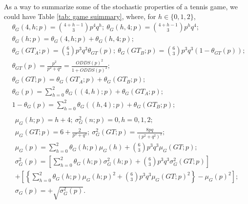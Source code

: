 \documentclass[11pt]{article}
\theoremstyle{plain}
\theoremstyle{definition}
\begin{document}
As a way to summarize some of the stochastic properties of a tennis game, we could have Table \ref{tab: game suimmary}, where, for $h \in \{0,1,2\}$,
%
\begin{eqnarray*}
   & \theta_G(4,h;p)  =  {{4+h-1} \choose 3} p^4 q^h; \
    \theta_G(h,4;p)  =  {{4+h-1} \choose 3} p^h q^4; & \\
   & \theta_G(h;p)  =  \theta_G(4,h;p) + \theta_G(h,4;p); & \\
   &\theta_G(GT_A;p) = {6 \choose 3} p^3 q^3 \theta_{GT}(p);\ \theta_G(GT_B;p) = {6 \choose 3} p^3 q^3 (1- \theta_{GT}(p)); & \\
   & \theta_{GT}(p) =  \frac{p^2}{p^2+q^2} = \frac{ODDS(p)^2}{1 + ODDS(p)^2}; & \\
   & \theta_G(GT;p) = \theta_G(GT_A;p) + \theta_G(GT_B;p); & \\
   & \theta_G(p) = \sum_{h=0}^2 \theta_G((4,h);p) + \theta_G(GT_A;p); & \\
    & 1 - \theta_G(p) = \sum_{h=0}^2 \theta_G((h,4);p) + \theta_G(GT_B;p); & \\
    \end{eqnarray*}
    \begin{eqnarray*}
& \mu_G(h;p) = h + 4; \ \sigma_G^2(n;p) = 0, h = 0, 1, 2; & \\
   & \mu_G(GT;p) =  6 + \frac{2}{p^2+q^2}; \ \sigma_G^2(GT;p) = \frac{8pq}{(p^2+q^2)^2}; & \\
   & \mu_G(p) = \sum_{h=0}^2 \theta_G(h;p) \mu_G(h) + {6 \choose 3} p^3 q^3 \mu_G(GT;p); & \\
   & \sigma_G^2(p) = \left[ \sum_{h=0}^2 \theta_G(h;p) \sigma_G^2(h;p) + {6 \choose 3} p^3 q^3 \sigma_G^2(GT;p) \right] & \\ & + \left[ \left\{ \sum_{h=0}^2 \theta_G(h;p) \mu_G(h;p)^2 + {6 \choose 3} p^3 q^3 \mu_G(GT;p)^2 \right\}  - \mu_G(p)^2\right]; & \\
   & \sigma_G(p) = + \sqrt{\sigma_G^2(p)}. &
\end{eqnarray*}
%
\end{document}

